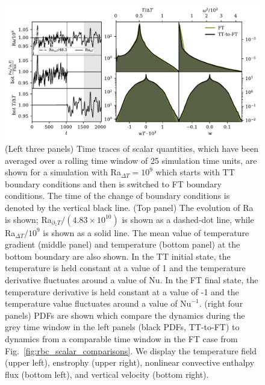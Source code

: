 \begin{figure}
\includegraphics[width=\textwidth]{./figs/rbc_restart_description.pdf}
\caption[Time traces and PDF comparisons of FT and TT-to-FT simulations]{ 
	(Left three panels) Time traces of scalar quantities, which have been averaged over a rolling time window of 25 simulation time units, are shown for a simulation with Ra$_{\Delta T} = 10^9$ which starts with TT boundary conditions and then is switched to FT boundary conditions.
	The time of the change of boundary conditions is denoted by the vertical black line.
	(Top panel) The evolution of Ra is shown; Ra$_{\partial_z T}/(4.83\times 10^{10})$ is shown as a dashed-dot line, while Ra$_{\Delta T}/10^9$ is shown as a solid line.
	The mean value of temperature gradient (middle panel) and temperature (bottom panel) at the bottom boundary are also shown.
	In the TT initial state, the temperature is held constant at a value of 1 and the temperature derivative fluctuates around a value of $\text{Nu}$.
	In the FT final state, the temperature derivative is held constant at a value of -1 and the temperature value fluctuates around a value of $\text{Nu}^{-1}$.
	(right four panels) PDFs are shown which compare the dynamics during the grey time window in the left panels (black PDFs, TT-to-FT) to dynamics from a comparable time window in the FT case from Fig.~\ref{fig:rbc_scalar_comparisons}.
	We display the temperature field (upper left), enstrophy (upper right), nonlinear convective enthalpy flux (bottom left), and vertical velocity (bottom right).
\label{fig:rbc_restart_description} }
\vspace{-0.25cm}
\end{figure}

